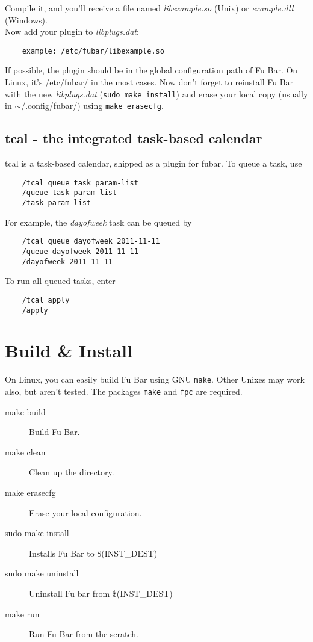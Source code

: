 \documentclass[12pt,a4paper]{article}
\begin{document}
	Compile it, and you'll receive a file named \textit{libexample.so} (Unix) 
	or \textit{example.dll} (Windows).\\
	Now add your plugin to \textit{libplugs.dat}:
	\begin{verbatim}
	example: /etc/fubar/libexample.so
	\end{verbatim}
	If possible, the plugin should be in the global configuration path of Fu 
	Bar. On Linux, it's /etc/fubar/ in the most cases. Now don't forget to
	reinstall Fu Bar with the new \textit{libplugs.dat} (\texttt{sudo make 
	install}) and erase your local copy (usually in $\sim$/.config/fubar/)
	using \texttt{make erasecfg}.
	
	\subsection{tcal - the integrated task-based calendar}
	
	tcal is a task-based calendar, shipped as a plugin for fubar.
	To queue a task, use
	\begin{verbatim}
	/tcal queue task param-list
	/queue task param-list
	/task param-list
	\end{verbatim}
	
	For example, the \textit{dayofweek} task can be queued by
	\begin{verbatim}
	/tcal queue dayofweek 2011-11-11
	/queue dayofweek 2011-11-11
	/dayofweek 2011-11-11
	\end{verbatim}
	
	To run all queued tasks, enter
	\begin{verbatim}
	/tcal apply
	/apply
	\end{verbatim}
	
	\section{Build \& Install}
	
	On Linux, you can easily build Fu Bar using GNU \texttt{make}.
	Other Unixes may work also, but aren't tested.
	The packages \texttt{make} and \texttt{fpc} are required.
	
	\begin{description}
	  \item[make build] Build Fu Bar.
	  \item[make clean] Clean up the directory.
	  \item[make erasecfg] Erase your local configuration.
	  \item[sudo make install] Installs Fu Bar to \$(INST\_DEST)
	  \item[sudo make uninstall] Uninstall Fu bar from \$(INST\_DEST)
	  \item[make run] Run Fu Bar from the scratch.
	\end{description}
	
\end{document}
